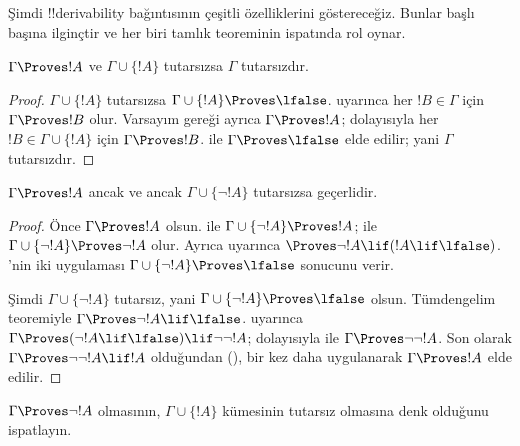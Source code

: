 \documentclass[../../../include/open-logic-section]{subfiles}
\begin{document}
      {}
      {}


Şimdi !!{derivability} bağıntısının çeşitli özelliklerini göstereceğiz. Bunlar
başlı başına ilginçtir ve her biri tamlık teoreminin ispatında rol oynar.

\begin{prop}
  $\Gamma \Proves !A$ ve $\Gamma \cup \{!A\}$ tutarsızsa $\Gamma$
  tutarsızdır.
\end{prop}

\begin{proof}
  $\Gamma \cup \{!A\}$ tutarsızsa $\Gamma \cup \{!A\} \Proves \lfalse$.
   uyarınca her $!B \in \Gamma$ için
  $\Gamma \Proves !B$ olur. Varsayım gereği ayrıca $\Gamma \Proves !A$;
  dolayısıyla her $!B \in \Gamma \cup \{!A\}$ için $\Gamma \Proves !B$.
   ile $\Gamma \Proves \lfalse$ elde edilir;
  yani $\Gamma$ tutarsızdır.
\end{proof}

\begin{prop}
$\Gamma \Proves !A$ ancak ve ancak $\Gamma \cup \{\lnot !A\}$ tutarsızsa
geçerlidir.
\end{prop}

\begin{proof}
Önce $\Gamma \Proves !A$ olsun.  ile
$\Gamma \cup \{\lnot !A\} \Proves !A$;  ile
$\Gamma \cup \{\lnot !A\} \Proves \lnot !A$ olur. Ayrıca
 uyarınca $\Proves \lnot !A \lif (!A \lif \lfalse)$.
'nin iki uygulaması $\Gamma \cup \{\lnot !A\}
\Proves \lfalse$ sonucunu verir.

Şimdi $\Gamma \cup \{\lnot !A\}$ tutarsız, yani $\Gamma \cup \{\lnot
!A\} \Proves \lfalse$ olsun. Tümdengelim teoremiyle $\Gamma \Proves
\lnot !A \lif \lfalse$.  uyarınca
$\Gamma \Proves (\lnot !A \lif \lfalse) \lif \lnot\lnot !A$; dolayısıyla
 ile $\Gamma \Proves \lnot\lnot !A$. Son olarak
$\Gamma \Proves \lnot\lnot !A \lif !A$ olduğundan
(),  bir kez daha uygulanarak
$\Gamma \Proves !A$ elde edilir.
\end{proof}

\begin{prob}
$\Gamma \Proves \lnot !A$ olmasının, $\Gamma \cup \{!A\}$ kümesinin
tutarsız olmasına denk olduğunu ispatlayın.
\end{prob}
\end{document}
